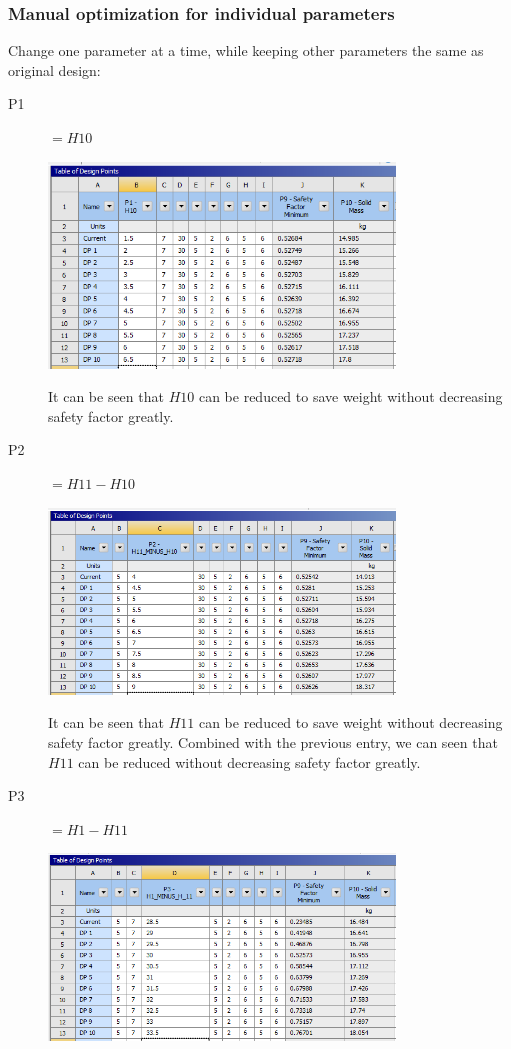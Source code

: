 \documentclass[a4paper,14pt]{extarticle}
\begin{document}
\subsubsection{Manual optimization for individual parameters}
Change one parameter at a time, while keeping other parameters the same as original design:
\begin{description}
\item[P1] $=H10$

\includegraphics[width=0.75\textwidth]{singleParam/P1.PNG}

It can be seen that $H10$ can be reduced to save weight without decreasing safety factor greatly.
\item[P2] $=H11-H10$

\includegraphics[width=0.75\textwidth]{singleParam/P2.PNG}

It can be seen that $H11$ can be reduced to save weight without decreasing safety factor greatly. Combined with the previous entry, we can seen that $H11$ can be reduced without decreasing safety factor greatly.
\item[P3] $=H1-H11$

\includegraphics[width=0.75\textwidth]{singleParam/P3.PNG}


\end{description}
\end{document}
